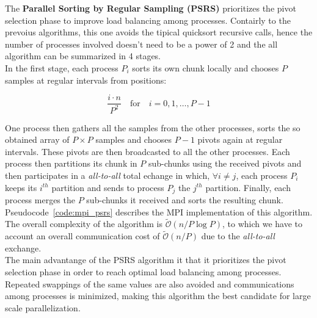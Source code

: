 \documentclass[../main.tex]{subfiles}
\begin{document}
The \textbf{Parallel Sorting by Regular Sampling (PSRS)} prioritizes
the pivot selection phase to improve load balancing among processes.
Contairly to the prevoius algorithms, this
one avoids the tipical quicksort recursive calls, hence the number
of processes involved doesn't need to be a power of 2 and the 
all algorithm can be summarized in 4 stages.\\
In the first stage, each process $P_i$ sorts its own chunk locally
and chooses $P$ samples at regular intervals from positions:

\begin{equation*}
    \frac{i \cdot n}{P^2} \quad \text{for} \quad i = 0, 1, \ldots, P-1
\end{equation*}

One process then gathers all the samples from the other processes, sorts
the so obtained array of $P \times P$ samples and chooses $P-1$ pivots
again at regular intervals. These pivots are then broadcasted to all the
other processes. Each process then partitions its chunk in $P$ sub-chunks using the received pivots and then participates in a \textit{all-to-all} total echange in which, $\forall i \neq j$, each process $P_i$ keeps its $i^{th}$ partition and sends to process $P_j$ the $j^{th}$ partition. Finally, each process merges the $P$ sub-chunks it received and sorts the
resulting chunk. Pseudocode~\ref{code:mpi_psrs} describes the MPI implementation of this algorithm.\\
The overall complexity of the algorithm is $\tilde{\mathcal{O}}(n/P \log P)$, to which we have to account an overall communication cost of $\tilde{\mathcal{O}}(n/P)$ due to the \textit{all-to-all} exchange.\\
The main advantange of the PSRS algorithm it that it prioritizes the pivot selection phase in order to reach optimal load balancing among processes. Repeated swappings of the same values are also avoided and communications among processes is minimized, making this algorithm the best candidate for large scale parallelization.\\
\end{document}
